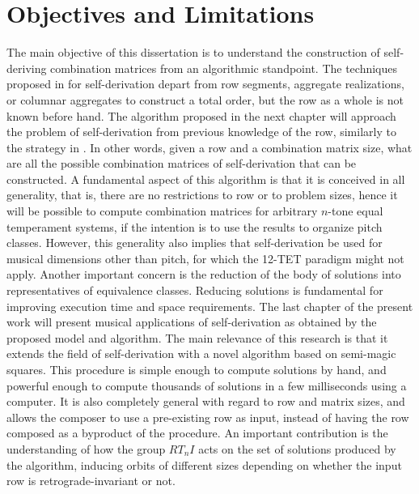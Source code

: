 
\section{Objectives and Limitations}

The main objective of this dissertation is to understand the construction of self-deriving combination matrices from an algorithmic standpoint. The techniques proposed in \cite{Starr1984} for self-derivation depart from row segments, aggregate realizations, or columnar aggregates to construct a total order, but the row as a whole is not known before hand. The algorithm proposed in the next chapter will approach the problem of self-derivation from previous knowledge of the row, similarly to the strategy in \cite{Kowalski1987b}. In other words, given a row and a combination matrix size, what are all the possible combination matrices of self-derivation that can be constructed. A fundamental aspect of this algorithm is that it is conceived in all generality, that is, there are no restrictions to row or to problem sizes, hence it will be possible to compute combination matrices for arbitrary $n$-tone equal temperament systems, if the intention is to use the results to organize pitch classes. However, this generality also implies that self-derivation be used for musical dimensions other than pitch, for which the 12-TET paradigm might not apply. Another important concern is the reduction of the body of solutions into representatives of equivalence classes. Reducing solutions is fundamental for improving execution time and space requirements. The last chapter of the present work will present musical applications of self-derivation as obtained by the proposed model and algorithm. The main relevance of this research is that it extends the field of self-derivation with a novel algorithm based on semi-magic squares. This procedure is simple enough to compute solutions by hand, and powerful enough to compute thousands of solutions in a few milliseconds using a computer. It is also completely general with regard to row and matrix sizes, and allows the composer to use a pre-existing row as input, instead of having the row composed as a byproduct of the procedure. An important contribution is the understanding of how the group $RT_nI$ acts on the set of solutions produced by the algorithm, inducing orbits of different sizes depending on whether the input row is retrograde-invariant or not.

